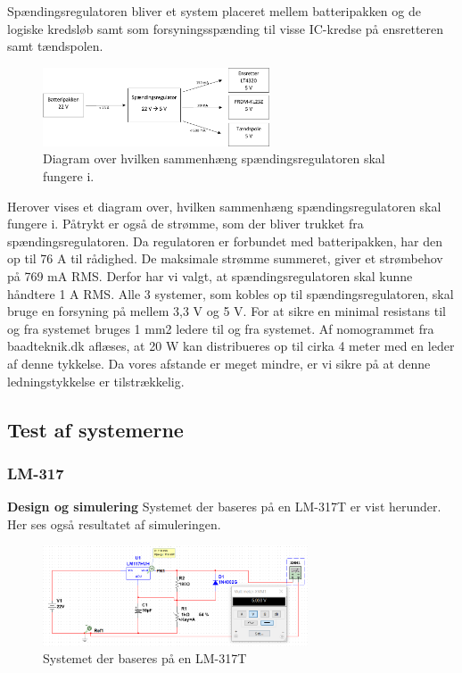 Spændingsregulatoren bliver et system placeret mellem batteripakken og de logiske kredsløb samt som forsyningsspænding til visse IC-kredse på ensretteren samt tændspolen.

\begin{figure}[h]
  \centering
  \includegraphics[width=0.6\textwidth]{jfig1.pdf}
  \caption{Diagram over hvilken sammenhæng spændingsregulatoren skal fungere i.}
  \label{fig:dia1}
\end{figure}

Herover vises et diagram over, hvilken sammenhæng spændingsregulatoren skal fungere i. Påtrykt er også de strømme, som der bliver trukket fra spændingsregulatoren. Da regulatoren er forbundet med batteripakken, har den op til 76 A til rådighed. De maksimale strømme summeret, giver et strømbehov på 769 mA RMS. Derfor har vi valgt, at spændingsregulatoren skal kunne håndtere 1 A RMS. Alle 3 systemer, som kobles op til spændingsregulatoren, skal bruge en forsyning på mellem 3,3 V og 5 V. 
For at sikre en minimal resistans til og fra systemet bruges 1 mm2 ledere til og fra systemet. Af nomogrammet fra baadteknik.dk aflæses, at 20 W kan distribueres op til cirka 4 meter med en leder af denne tykkelse. Da vores afstande er meget mindre, er vi sikre på at denne ledningstykkelse er tilstrækkelig. 


\subsection{Test af systemerne}
\label{sec:test-af-systemerne}

\subsubsection{LM-317}
\label{sec:lm-317}
\textbf{Design og simulering}\newline
Systemet der baseres på en LM-317T er vist herunder. Her ses også resultatet af simuleringen.

\begin{figure}[h]
  \centering
  \includegraphics[width=0.7\textwidth]{bil1.png}
  \caption{Systemet der baseres på en LM-317T}
  \label{fig:bil1}
\end{figure}

